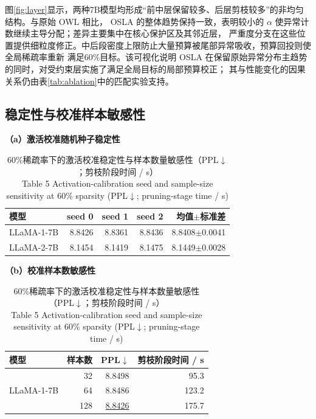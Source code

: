 \documentclass[UTF8,fontset=fandol]{ctexart}
\renewcommand{\arraystretch}{1.08}
\newcommand{\second}[1]{\underline{#1}}
\begin{document}
\newpage
图\ref{fig:layer}显示，两种7B模型均形成“前中层保留较多、后层剪枝较多”的非均匀结构。与原始 OWL 相比，
OSLA 的整体趋势保持一致，表明较小的 $\alpha$ 使异常计数继续主导分配；差异主要集中在核心保护区及其邻近层，
严重度分支在这些位置提供细粒度修正。中后段密度上限防止大量预算被尾部异常吸收，预算回投则使全局稀疏率重新
满足60\%目标。该可视化说明 OSLA 在保留原始异常分布主趋势的同时，对受约束层实施了满足全局目标的局部预算校正；
其与性能变化的因果关系仍由表\ref{tab:ablation}中的匹配实验支持。

\FloatBarrier
\subsection{稳定性与校准样本敏感性}

\begin{table}[!htbp]
\centering
\caption{60\%稀疏率下的激活校准稳定性与样本数量敏感性（PPL$\downarrow$；剪枝阶段时间 / s）\\
Table 5 Activation-calibration seed and sample-size sensitivity at 60\% sparsity (PPL$\downarrow$; pruning-stage time / s)}
\label{tab:stability}
\begin{minipage}{0.47\textwidth}
\centering
\scriptsize
\textbf{（a）激活校准随机种子稳定性}\par\vspace{2pt}
\setlength{\tabcolsep}{3.2pt}
\renewcommand{\arraystretch}{0.98}
\begin{tabular}{lrrrr}
\toprule
模型 & seed 0 & seed 1 & seed 2 & 均值$\pm$标准差 \\
\midrule
LLaMA-1-7B & 8.8426 & 8.8361 & 8.8436 & 8.8408$\pm$0.0041 \\
LLaMA-2-7B & 8.1454 & 8.1419 & 8.1475 & 8.1449$\pm$0.0028 \\
\bottomrule
\end{tabular}
\end{minipage}
\hfill
\begin{minipage}{0.49\textwidth}
\centering
\scriptsize
\textbf{（b）校准样本数敏感性}\par\vspace{2pt}
\setlength{\tabcolsep}{4.2pt}
\renewcommand{\arraystretch}{0.96}
\begin{tabular}{lrrr}
\toprule
模型 & 样本数 & PPL$\downarrow$ & 剪枝阶段时间 / s \\
\midrule
\multirow{4}{*}{LLaMA-1-7B}
 & 32  & 8.8498 & 95.3 \\
 & 64  & 8.8486 & 123.2 \\
 & 128 & \second{8.8426} & 175.7 \\

\end{tabular}
\end{minipage}
\end{table}
\end{document}
